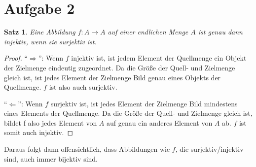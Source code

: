 \documentclass[a4paper,10pt]{article}
\newtheorem{theorem}{Satz}
\begin{document}
\section{Aufgabe 2}

\begin{theorem}
 Eine Abbildung $f: A \rightarrow A$ auf einer endlichen Menge $A$ ist genau dann injektiv, wenn sie surjektiv ist.
\end{theorem}

\begin{proof}
 ``$\Rightarrow$'': Wenn $f$ injektiv ist, ist jedem Element der Quellmenge ein Objekt der Zielmenge eindeutig zugeordnet. Da die Größe der Quell- und Zielmenge gleich ist, ist jedes Element
 der Zielmenge Bild genau eines Objekts der Quellmenge. $f$ ist also auch surjektiv.
 
 ``$\Leftarrow$'': Wenn $f$ surjektiv ist, ist jedes Element der Zielmenge Bild mindestens eines Elements der Quellmenge. Da die Größe der Quell- und Zielmenge gleich ist, bildet f also jedes
 Element von $A$ auf genau ein anderes Element von $A$ ab. $f$ ist somit auch injektiv.
\end{proof}

Daraus folgt dann offensichtlich, dass Abbildungen wie $f$, die surjektiv/injektiv sind, auch immer bijektiv sind.
\end{document}
